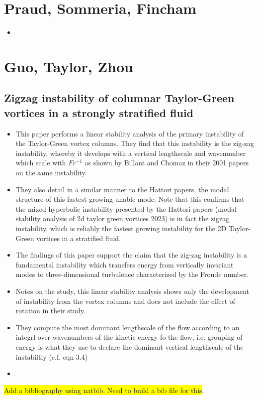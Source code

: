 \documentclass{article}
\begin{document}
\section{Praud, Sommeria, Fincham}
    \begin{itemize}
        \item 
    \end{itemize}

\section{Guo, Taylor, Zhou}
    \subsection{Zigzag instability of columnar Taylor-Green vortices in a
    strongly stratified fluid}
    \begin{itemize}
        \item This paper performs a linear stability analysis of the primary
        instability of the Taylor-Green vortex columns. They find that this
        instability is the zig-zag instability, whereby it develops with a
        vertical lengthscale and wavenumber which scale with $Fr^{-1}$ as shown
        by Billant and Chomaz in their 2001 papers on the same instability. 
        \item They also detail in a similar manner to the Hattori papers, the
        modal structure of this fastest growing unable mode. Note that this
        confirms that the mixed hyperbolic instability presented by the Hattori
        papers (modal stability analysis of 2d taylor green vortices 2023) is in
        fact the zigzag instability, which is reliably the fastest growing
        instability for the 2D Taylor-Green vortices in a stratified fluid. 
        \item The findings of this paper support the claim that the zig-zag
        instability is a fundamental instability which transfers energy from
        vertically invariant modes to three-dimensional turbulence characterized
        by the Froude number. 
        \item Notes on the study, this linear stability analysis shows only the
        development of instability from the vortex columns and does not include
        the effect of rotation in their study. 
        \item They compute the most dominant lengthscale of the flow according
        to an integrl over wavenumbers of the kinetic energy fo the flow, i.e.
        grouping of energy is what they use to declare the dominant vertical
        lengthscale of the instabiltiy (c.f. eqn 3.4)
        \item 
    \end{itemize}

\colorbox{yellow}{Add a bibliography using natbib. Need to build a bib file for this}. 
\end{document}
